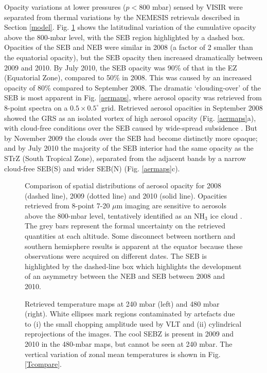 \documentclass[final,5p,times,twocolumn,authoryear]{elsarticle}
\begin{document}
Opacity variations at lower pressures ($p<800$ mbar) sensed by VISIR were separated from thermal variations by the NEMESIS retrievals described in Section \ref{model}.     Fig. \ref{gas_compare} shows the latitudinal variation of the cumulative opacity above the 800-mbar level, with the SEB region highlighted by a dashed box.  Opacities of the SEB and NEB were similar in 2008 (a factor of 2 smaller than the equatorial opacity), but the SEB opacity then increased dramatically between 2009 and 2010.  By July 2010, the SEB opacity was 90\% of that in the EZ (Equatorial Zone), compared to 50\% in 2008.  This was caused by an increased opacity of 80\% compared to September 2008.  The dramatic `clouding-over' of the SEB is most apparent in Fig. \ref{aermaps}, where aerosol opacity was retrieved from 8-point spectra on a $0.5\times0.5^\circ$ grid.  Retrieved aerosol opacities in September 2008 showed the GRS as an isolated vortex of high aerosol opacity (Fig. \ref{aermaps}a), with cloud-free conditions over the SEB caused by wide-spread subsidence \citep[similar cloud-free conditions were previously identified by][throughout much of the 2000-2008 period]{10fletcher_grs}.  But by November 2009 the clouds over the SEB had become distinctly more opaque; and by July 2010 the majority of the SEB interior had the same opacity as the STrZ (South Tropical Zone), separated from the adjacent bands by a narrow cloud-free SEB(S) and wider SEB(N) (Fig. \ref{aermaps}c).

\begin{figure}[tbp]
\centering
{}
\caption{Comparison of spatial distributions of aerosol opacity for 2008 (dashed line), 2009 (dotted line) and 2010 (solid line).  Opacities retrieved from 8-point 7-20 $\mu$m imaging are sensitive to aerosols above the 800-mbar level, tentatively identified as an NH$_3$ ice cloud \citep[e.g.,][]{04wong, 05matcheva}. The grey bars represent the formal uncertainty on the retrieved quantities at each altitude.  Some disconnect between northern and southern hemisphere results is apparent at the equator because these observations were acquired on different dates.  The SEB is highlighted by the dashed-line box which highlights the development of an asymmetry between the NEB and SEB between 2008 and 2010.}
\label{gas_compare}
\end{figure}

\begin{figure*}[tbp]
\centering
{}
\caption{Retrieved temperature maps at 240 mbar (left) and 480 mbar (right).  White ellipses mark regions contaminated by artefacts due to (i) the small chopping amplitude used by VLT and (ii) cylindrical reprojections of the images.  The cool SEBZ is present in 2009 and 2010 in the 480-mbar maps, but cannot be seen at 240 mbar.  The vertical variation of zonal mean temperatures is shown in Fig. \ref{Tcompare}.}
\label{tempmaps}
\end{figure*}
\end{document}
